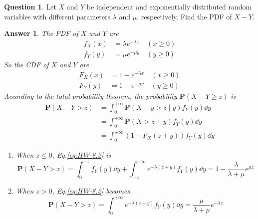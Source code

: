 \documentclass[utf8]{article}
\theoremstyle{definition}%
\newtheorem{question}{Question} %
\theoremstyle{plain}%
\newtheorem{answer}{Answer} %
\begin{document}
\begin{question}
    Let $X$ and $Y$ be independent and exponentially distributed random variables with different parameters $\lambda$ and $\mu$, respectively. Find the PDF of $X - Y$.
\end{question}
\begin{answer}
    The PDF of $X$ and $Y$ are
    \begin{equation}
    \begin{aligned}
        f_{X}(x) &= \lambda e^{-\lambda x} \quad (x \geq 0) \\
        f_{Y}(y) &= \mu e^{-\mu y} \quad (y \geq 0)
    \end{aligned}
    \end{equation}
    So the CDF of $X$ and $Y$ are
    \begin{equation}
    \begin{aligned}
        F_{X}(x) &= 1 - e^{-\lambda x} \quad (x \geq 0) \\
        F_{Y}(y) &= 1 - e^{-\mu y} \quad (y \geq 0)
    \end{aligned}
    \end{equation}
    According to the total probability theorem, the probability $\mathbf{P}(X - Y \geq z)$ is
    \begin{equation}
    \begin{aligned}
        \label{eq:HW-8.2}
        \mathbf{P}(X - Y > z) &= \int_{0}^{+\infty} \mathbf{P}(X - y > z \mid y) f_{Y}(y) \dd{y} \\ 
        &= \int_{0}^{+\infty} \mathbf{P}(X > z + y) f_{Y}(y) \dd{y} \\
        &= \int_{0}^{+\infty} \left(1 - F_{X}(z + y)\right) f_{Y}(y) \dd{y} 
    \end{aligned}
    \end{equation}
    \begin{enumerate}[label=(\alph*)]
        \item When $z \leq 0$, Eq.\ref{eq:HW-8.2} is
            \begin{equation}
                \mathbf{P}(X - Y > z) = \int_{0}^{-z} f_{Y}(y) \dd{y} + \int_{-z}^{+\infty} e^{-\lambda (z + y)} f_{Y}(y) \dd{y} = 1 - \frac{\lambda}{\lambda + \mu} e^{\mu z}
            \end{equation}
        \item When $z > 0$, Eq.\ref{eq:HW-8.2} becomes
            \begin{equation}
                \mathbf{P}(X - Y > z) = \int_{0}^{+\infty} e^{-\lambda (z + y)} f_{Y}(y) \dd{y} = \frac{\mu}{\lambda + \mu} e^{-\lambda z}

\end{equation}
\end{enumerate}
\end{answer}
\end{document}
